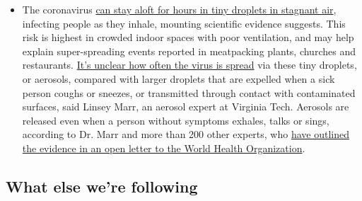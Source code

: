 \begin{itemize}
  \begin{itemize}
  \tightlist
  \item
    The coronavirus
    \href{https://www.nytimes.com/2020/07/04/health/239-experts-with-one-big-claim-the-coronavirus-is-airborne.html?action=click\&pgtype=Article\&state=default\&region=MAIN_CONTENT_3\&context=storylines_faq}{can
    stay aloft for hours in tiny droplets in stagnant air}, infecting
    people as they inhale, mounting scientific evidence suggests. This
    risk is highest in crowded indoor spaces with poor ventilation, and
    may help explain super-spreading events reported in meatpacking
    plants, churches and restaurants.
    \href{https://www.nytimes.com/2020/07/06/health/coronavirus-airborne-aerosols.html?action=click\&pgtype=Article\&state=default\&region=MAIN_CONTENT_3\&context=storylines_faq}{It's
    unclear how often the virus is spread} via these tiny droplets, or
    aerosols, compared with larger droplets that are expelled when a
    sick person coughs or sneezes, or transmitted through contact with
    contaminated surfaces, said Linsey Marr, an aerosol expert at
    Virginia Tech. Aerosols are released even when a person without
    symptoms exhales, talks or sings, according to Dr. Marr and more
    than 200 other experts, who
    \href{https://academic.oup.com/cid/article/doi/10.1093/cid/ciaa939/5867798}{have
    outlined the evidence in an open letter to the World Health
    Organization}.
  \end{itemize}
\end{itemize}

\hypertarget{what-else-were-following}{%
\subsection{What else we're following}\label{what-else-were-following}}

